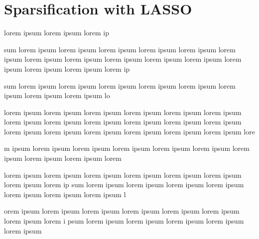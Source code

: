 \documentclass{amsart}
\begin{document}
\section{Sparsification with LASSO}

lorem ipsum lorem ipsum lorem ip

sum lorem ipsum lorem ipsum lorem ipsum lorem ipsum lorem ipsum lorem ipsum lorem ipsum lorem ipsum lorem ipsum lorem ipsum lorem ipsum lorem ipsum lorem ipsum lorem ipsum lorem ip

sum lorem ipsum lorem ipsum lorem ipsum lorem ipsum lorem ipsum lorem ipsum lorem ipsum lorem ipsum lo

lorem ipsum lorem ipsum lorem ipsum lorem ipsum lorem ipsum lorem ipsum lorem ipsum lorem ipsum lorem ipsum lorem ipsum lorem ipsum lorem ipsum lorem ipsum lorem ipsum lorem ipsum lorem ipsum lorem ipsum lorem ipsum lore

m ipsum lorem ipsum lorem ipsum lorem ipsum lorem ipsum lorem ipsum lorem ipsum lorem ipsum lorem ipsum lorem 


 lorem ipsum lorem ipsum lorem ipsum lorem ipsum lorem ipsum lorem ipsum lorem ipsum lorem ip
 sum lorem ipsum lorem ipsum lorem ipsum lorem ipsum lorem ipsum lorem ipsum lorem ipsum l
 
 orem ipsum lorem ipsum lorem ipsum lorem ipsum lorem ipsum lorem ipsum lorem ipsum lorem i
 psum lorem ipsum lorem ipsum lorem ipsum lorem ipsum lorem ipsum  
\end{document}
